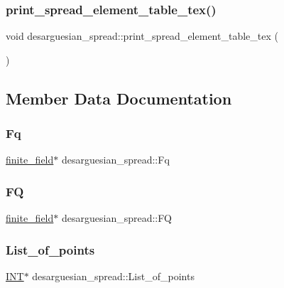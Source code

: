 \subsubsection{\texorpdfstring{print\+\_\+spread\+\_\+element\+\_\+table\+\_\+tex()}{print\_spread\_element\_table\_tex()}}
{\footnotesize\ttfamily void desarguesian\+\_\+spread\+::print\+\_\+spread\+\_\+element\+\_\+table\+\_\+tex (\begin{DoxyParamCaption}{ }\end{DoxyParamCaption})}



\subsection{Member Data Documentation}
\mbox{\label{classdesarguesian__spread_a25013eacbdad583219b7e1ab83870c06}} 
\subsubsection{\texorpdfstring{Fq}{Fq}}
{\footnotesize\ttfamily \mbox{\hyperlink{classfinite__field}{finite\+\_\+field}}$\ast$ desarguesian\+\_\+spread\+::\+Fq}

\mbox{\label{classdesarguesian__spread_a245dfb3599bb1931d09f85275e1a7c71}} 
\subsubsection{\texorpdfstring{FQ}{FQ}}
{\footnotesize\ttfamily \mbox{\hyperlink{classfinite__field}{finite\+\_\+field}}$\ast$ desarguesian\+\_\+spread\+::\+FQ}

\mbox{\label{classdesarguesian__spread_ace803e92bc21ad3eb119bf8c83b9496a}} 
\subsubsection{\texorpdfstring{List\+\_\+of\+\_\+points}{List\_of\_points}}
{\footnotesize\ttfamily \mbox{\hyperlink{galois_8h_a09fddde158a3a20bd2dcadb609de11dc}{I\+NT}}$\ast$ desarguesian\+\_\+spread\+::\+List\+\_\+of\+\_\+points}


